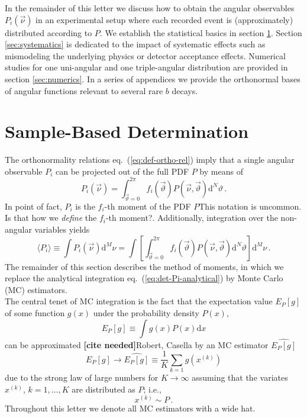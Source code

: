 \documentclass[aps,prd,reprint,nofootinbib,preprintnumbers]{revtex4}
\newcommand{\dd}{\text{d}}
\newcommand{\refeq}[1]{eq.~(\ref{eq:#1})}
\newcommand{\nuvec}{\vec{\nu}}
\newcommand{\thvec}{\vec{\vartheta}}
\renewcommand{\theta}{\vartheta}
\newcommand{\what}[1]{\widehat{#1}}
\newcommand{\fred}[1]{{\color{brown!85!black}#1}}
\newcommand{\citeneeded}{{\color{red}\bf [cite needed]}}
\begin{document}
In the remainder of this letter we discuss how to obtain the angular
observables $P_i(\nuvec)$ in an experimental setup where each recorded
event is (approximately) distributed according to $P$.  We establish
the statistical basics in section \ref{sec:sample-based-det}. Section
\ref{sec:systematics} is dedicated to the impact of systematic effects
such as mismodeling the underlying physics or detector acceptance
effects. Numerical studies for one uni-angular and one triple-angular
distribution are provided in section \ref{sec:numerics}. In a series
of appendices we provide the orthonormal bases of angular functions
relevant to several rare $b$ decays.



\section{Sample-Based Determination}
\label{sec:sample-based-det}

The orthonormality relations \refeq{def-ortho-rel} imply that a single angular observable $P_i$
can be projected out of the full PDF $P$ by means of
\begin{equation}
    \label{eq:det-Pi-analytical}
    P_i(\nuvec) = \int_{\thvec = 0}^{2\pi} f_i(\thvec) P(\nuvec, \thvec) \dd^N \theta\,.
\end{equation}
In point of fact, $P_i$ is the $f_i$-th moment of the PDF $P$\fred{This
  notation is uncommon. Is that how we \emph{define} the $f_i$-th
  moment?}. Additionally, integration over the non-angular variables
yields
\begin{equation}
    \langle P_i\rangle
    \equiv \int P_i(\nuvec) \dd^M \nu
    = \int \left[\int_{\thvec=0}^{2\pi} f_i(\thvec) P(\nuvec,\thvec) \dd^N\theta\right]\dd^M \nu\,.
\end{equation}
The remainder of this section  describes the method of moments, in which we replace the
analytical integration \refeq{det-Pi-analytical} by Monte Carlo (MC) estimators.\\


The central tenet of MC integration is the fact that the expectation value $E_P[g]$ of some function
$g(x)$ under the probability density $P(x)$,
\begin{equation}
    E_P[g] \equiv \int g(x) P(x) \dd x
\end{equation}
can be approximated \citeneeded\fred{Robert, Casella} by an MC estimator $\what{E_P[g]}$
\begin{equation}
    \label{eq:mc-id}
    E_P[g] \to \widehat{E_P[g]} \equiv \frac{1}{K} \sum_{k=1} g(x^{(k)})
\end{equation}
due to the strong law of large numbers for $K \to \infty$ assuming
that the variates $x^{(k)}$, $k = 1, \dots, K$ are distributed as
$P$; i.e.,
\begin{equation}
    x^{(k)} \sim P\,.
\end{equation}
Throughout this letter we denote all MC estimators with a wide hat.\\
\end{document}
